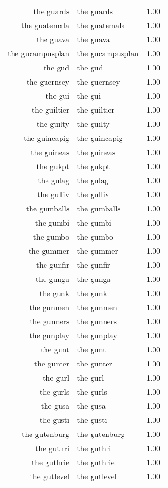 \begin{table}[ht]
\begin{tabular}{rlr}
  the guards & the guards & 1.00 \\ 
  the guatemala & the guatemala & 1.00 \\ 
  the guava & the guava & 1.00 \\ 
  the gucampusplan & the gucampusplan & 1.00 \\ 
  the gud & the gud & 1.00 \\ 
  the guernsey & the guernsey & 1.00 \\ 
  the gui & the gui & 1.00 \\ 
  the guiltier & the guiltier & 1.00 \\ 
  the guilty & the guilty & 1.00 \\ 
  the guineapig & the guineapig & 1.00 \\ 
  the guineas & the guineas & 1.00 \\ 
  the gukpt & the gukpt & 1.00 \\ 
  the gulag & the gulag & 1.00 \\ 
  the gulliv & the gulliv & 1.00 \\ 
  the gumballs & the gumballs & 1.00 \\ 
  the gumbi & the gumbi & 1.00 \\ 
  the gumbo & the gumbo & 1.00 \\ 
  the gummer & the gummer & 1.00 \\ 
  the gunfir & the gunfir & 1.00 \\ 
  the gunga & the gunga & 1.00 \\ 
  the gunk & the gunk & 1.00 \\ 
  the gunmen & the gunmen & 1.00 \\ 
  the gunners & the gunners & 1.00 \\ 
  the gunplay & the gunplay & 1.00 \\ 
  the gunt & the gunt & 1.00 \\ 
  the gunter & the gunter & 1.00 \\ 
  the gurl & the gurl & 1.00 \\ 
  the gurls & the gurls & 1.00 \\ 
  the gusa & the gusa & 1.00 \\ 
  the gusti & the gusti & 1.00 \\ 
  the gutenburg & the gutenburg & 1.00 \\ 
  the guthri & the guthri & 1.00 \\ 
  the guthrie & the guthrie & 1.00 \\ 
  the gutlevel & the gutlevel & 1.00 \\ 

\end{tabular}
\end{table}

